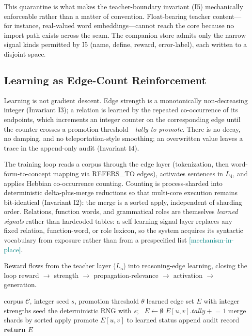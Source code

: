 \documentclass[11pt,a4paper]{article}
\newcommand{\statusmech}{\textcolor{teal}{\small\textsf{[mechanism-in-place]}}}
\begin{document}
This quarantine is what makes the teacher-boundary invariant (I5)
mechanically enforceable rather than a matter of convention. Float-bearing
teacher content---for instance, real-valued word embeddings---cannot
reach the core because no import path exists across the seam. The
companion store admits only the narrow signal kinds permitted by I5
(name, define, reward, error-label), each written to a disjoint space.

\subsection{Learning as Edge-Count Reinforcement}
\label{sec:arch-learning}

Learning is not gradient descent. Edge strength is a monotonically
non-decreasing integer (Invariant I3); a relation is learned by the
repeated co-occurrence of its endpoints, which increments an integer
counter on the corresponding edge until the counter crosses a promotion
threshold---\emph{tally-to-promote}. There is no decay, no damping, and
no teleportation-style smoothing; an overwritten value leaves a trace in
the append-only audit (Invariant I4).

The training loop reads a corpus through the edge layer (tokenization,
then word-form-to-concept mapping via REFERS\_TO edges), activates
sentences in $L_4$, and applies Hebbian co-occurrence counting. Counting
is process-sharded into deterministic delta-plus-merge reductions so that
multi-core execution remains bit-identical (Invariant I2): the merge is a
sorted apply, independent of sharding order. Relations, function words,
and grammatical roles are themselves \emph{learned signals} rather than
hardcoded tables: a self-learning signal layer replaces any fixed
relation, function-word, or role lexicon, so the system acquires its
syntactic vocabulary from exposure rather than from a prespecified list
\statusmech.

Reward flows from the teacher layer ($L_5$) into reasoning-edge learning,
closing the loop
reward $\to$ strength $\to$ propagation-relevance $\to$ activation $\to$
generation.

\begin{algorithm}[t]
\caption{Tally-to-promote edge reinforcement}
\label{alg:tally}
\begin{algorithmic}[1]
\Require corpus $\mathcal{C}$, integer seed $s$, promotion threshold $\theta$
\Ensure learned edge set $E$ with integer strengths
\State seed the deterministic RNG with $s$; \ $E \gets \emptyset$
    \State $E[u,v].\textit{tally} \mathrel{+}{=} 1$ 
  \EndFor
\EndFor
\State merge shards by sorted apply 
  \State promote $E[u,v]$ to learned status
  \State append audit record 
\EndFor
\State \textbf{return} $E$
\end{algorithmic}
\end{algorithm}
\end{document}
